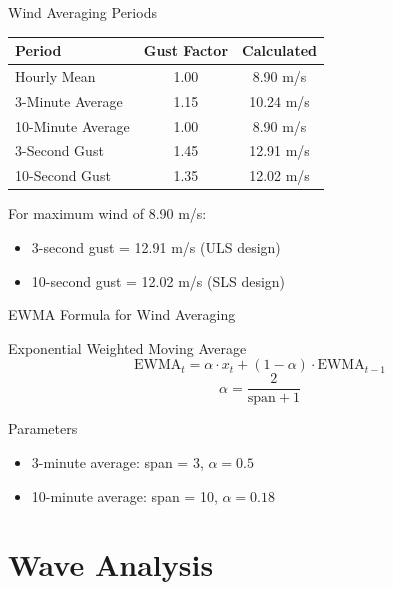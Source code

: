 \documentclass[10pt]{beamer}
\begin{document}
\begin{frame}{Wind Averaging Periods}
\begin{table}
\centering
\begin{tabular}{lcc}
\hline
\textbf{Period} & \textbf{Gust Factor} & \textbf{Calculated} \\
\hline
Hourly Mean & 1.00 & 8.90 m/s \\
3-Minute Average & 1.15 & 10.24 m/s \\
10-Minute Average & 1.00 & 8.90 m/s \\
\alert{3-Second Gust} & \alert{1.45} & \alert{12.91 m/s} \\
10-Second Gust & 1.35 & 12.02 m/s \\
\hline
\end{tabular}
\end{table}

\begin{example}
For maximum wind of 8.90 m/s:
\begin{itemize}
    \item 3-second gust = \alert{12.91 m/s} (ULS design)
    \item 10-second gust = 12.02 m/s (SLS design)
\end{itemize}
\end{example}
\end{frame}

\begin{frame}{EWMA Formula for Wind Averaging}
\begin{block}{Exponential Weighted Moving Average}
\[
\mbox{EWMA}_t = \alpha \cdot x_t + (1 - \alpha) \cdot \mbox{EWMA}_{t-1}
\]
\[
\alpha = \frac{2}{\mbox{span} + 1}
\]
\end{block}

\begin{block}{Parameters}
\begin{itemize}
    \item 3-minute average: span = 3, $\alpha = 0.5$
    \item 10-minute average: span = 10, $\alpha = 0.18$
\end{itemize}
\end{block}
\end{frame}

\section{Wave Analysis}
\end{document}
